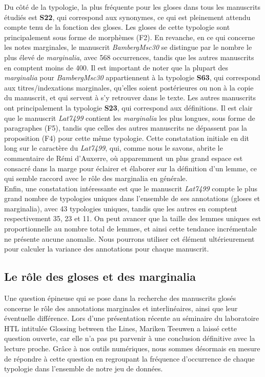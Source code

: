 \documentclass[a4paper, twoside, 12pt]{book}
\begin{document}
{Du côté de la typologie, la plus fréquente pour les gloses dans tous les manuscrits étudiés est \textbf{S22}, qui correspond aux synonymes, ce qui est pleinement attendu compte tenu de la fonction des gloses. Les gloses de cette typologie sont principalement sous forme de morphèmes (F2). En revanche, en ce qui concerne les notes marginales, le manuscrit \textit{BambergMsc30} se distingue par le nombre le plus élevé de \textit{marginalia}, avec 568 occurrences, tandis que les autres manuscrits en comptent moins de 400. Il est important de noter que la plupart des \textit{marginalia} pour \textit{BambergMsc30} appartiennent à la typologie \textbf{S63}, qui correspond aux titres/indexations marginales, qu'elles soient postérieures ou non à la copie du manuscrit, et qui servent à s'y retrouver dans le texte. Les autres manuscrits ont principalement la typologie \textbf{S23}, qui correspond aux définitions. Il est clair que le manuscrit \textit{Lat7499} contient les \textit{marginalia} les plus longues, sous forme de paragraphes (F5), tandis que celles des autres manuscrits ne dépassent pas la proposition (F4) pour cette même typologie. Cette constatation initiale en dit long sur le caractère du \textit{Lat7499}, qui, comme nous le savons, abrite le commentaire de Rémi d'Auxerre, où apparemment un plus grand espace est consacré dans la marge pour éclairer et élaborer sur la définition d'un lemme, ce qui semble raccord avec le rôle des marginalia en générale.\\

Enfin, une constatation intéressante est que le manuscrit \textit{Lat7499} compte le plus grand nombre de typologies uniques dans l'ensemble de ses annotations (gloses et marginalia), avec 43 typologies uniques, tandis que les autres en comptent respectivement 35, 23 et 11. On peut avancer que la taille des lemmes uniques est proportionnelle au nombre total de lemmes, et ainsi cette tendance incrémentale ne présente aucune anomalie. Nous pourrons utiliser cet élément ultérieurement pour calculer la variance des annotations pour chaque manuscrit.



\subsection{Le rôle des gloses et des marginalia}

Une question épineuse qui se pose dans la recherche des manuscrits glosés concerne le rôle des annotations marginales et interlinéaires, ainsi que leur éventuelle différence. Lors d'une présentation récente au séminaire du laboratoire HTL intitulée \og{}Glossing between the Lines\fg{}, Mariken Teeuwen a laissé cette question ouverte, car elle n'a pas pu parvenir à une conclusion définitive avec la lecture proche. Grâce à nos outils numériques, nous sommes désormais en mesure de répondre à cette question en regroupant la fréquence d'occurrence de chaque typologie dans l'ensemble de notre jeu de données.\\

}
\end{document}

